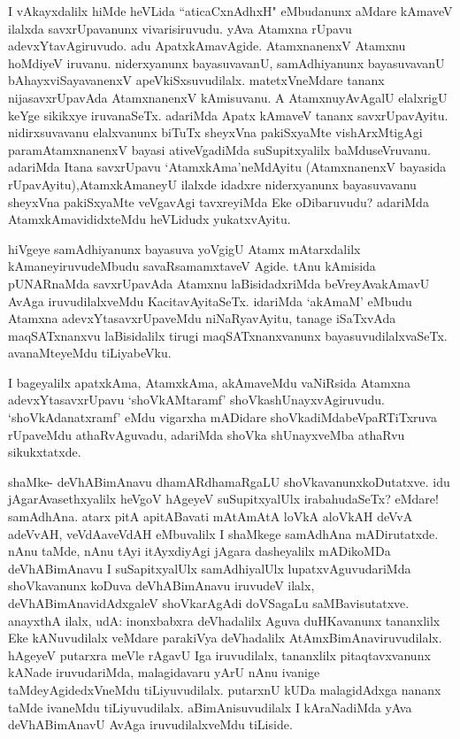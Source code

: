 
\begin{artha}
I vAkayxdalilx hiMde heVLida ``aticaCxnAdhxH" eMbudanunx aMdare kAmaveV ilalxda savxrUpavanunx vivarisiruvudu. yAva Atamxna rUpavu adevxYtavAgiruvudo. adu ApatxkAmavAgide. AtamxnanenxV Atamxnu hoMdiyeV iruvanu. niderxyanunx bayasuvavanU, samAdhiyanunx bayasuvavanU bAhayxviSayavanenxV apeVkiSxsuvudilalx. matetxVneMdare tananx nijasavxrUpavAda AtamxnanenxV kAmisuvanu. A Atamxnu\break yAvAgalU elalxrigU keYge sikikxye iruvanaSeTx. adariMda Apatx kAmaveV tananx savxrUpavAyitu. nidirxsuvavanu elalxvanunx biTuTx sheyxVna pakiSxyaMte vishArxMtigAgi paramAtamxnanenxV bayasi ativeVgadiMda suSupitxyalilx baMduseVruvanu. adariMda Itana savxrUpavu `AtamxkAma'neMdAyitu (AtamxnanenxV bayasida rUpavAyitu),\break AtamxkAmaneyU ilalxde idadxre niderxyanunx bayasuvavanu sheyxVna pakiSxyaMte veVgavAgi tavxreyiMda Eke oDibaruvudu? adariMda AtamxkAmavididxteMdu heVLidudx yukatxvAyitu. 
\end{artha}%

\begin{artha}
hiVgeye samAdhiyanunx bayasuva yoVgigU Atamx mAtarxdalilx kAmaneyiruvudeMbudu savaRsamamxtaveV Agide. tAnu kAmisida pUNARnaMda savxrUpavAda Atamxnu laBisidadxriMda beVreyAva\break kAmavU AvAga iruvudilalxveMdu KacitavAyitaSeTx. idariMda `akAmaM' eMbudu Atamxna adevxYtasavxrUpaveMdu niNaRyavAyitu, tanage iSaTxvAda maqSATxnanxvu laBisidalilx tirugi maqSATxnanxvanunx bayasuvudilalxvaSeTx. avanaMteyeMdu tiLiyabeVku.
\end{artha}

\begin{artha}
I bageyalilx apatxkAma, AtamxkAma, akAmaveMdu vaNiRsida Atamxna adevxYtasavxrUpavu `shoVkAMtaramf' shoVkashUnayxvAgiruvudu. `shoVkAdanatxramf' eMdu vigarxha mADidare shoVkadiMda\break beVpaRTiTxruva rUpaveMdu athaRvAguvadu, adariMda shoVka shUnayxveMba athaRvu sikukxtatxde. 
\end{artha}

\begin{artha}
shaMke- deVhABimAnavu dhamARdhamaRgaLU shoVkavanunx\break koDutatxve. idu jAgarAvasethxyalilx heVgoV hAgeyeV suSupitxyalUlx irabahudaSeTx? eMdare! samAdhAna. atarx pitA apitABavati mAtA\s mAtA loVkA aloVkAH deVvA adeVvAH, veVdA\break aveVdAH eMbuvalilx I shaMkege samAdhAna mADirutatxde. nAnu taMde, nAnu tAyi itAyxdiyAgi jAgara dasheyalilx mADikoMDa deVhABimAnavu I suSapitxyalUlx samAdhiyalUlx lupatxvAguvudariMda shoVkavanunx koDuva deVhABimAnavu iruvudeV ilalx, deVhABimAnavidAdxgaleV shoVkarAgAdi doVSagaLu saMBavisutatxve. anayxthA ilalx, udA: inonxbabxra deVhadalilx Aguva duHKavanunx tananxlilx Eke kANuvudilalx veMdare parakiVya deVhadalilx AtAmxBimAnaviruvudilalx. hAgeyeV putarxra meVle rAgavU Iga iruvudilalx, tananxlilx pitaqtavxvanunx kANade iruvudariMda, malagidavaru yArU nAnu ivanige taMdeyAgidedxVneMdu tiLiyuvudilalx. putarxnU kUDa malagidAdxga nananx taMde ivaneMdu tiLiyuvudilalx. aBimAnisuvudilalx I kAraNadiMda yAva deVhABimAnavU AvAga iruvudilalxveMdu tiLiside.
\end{artha}%

